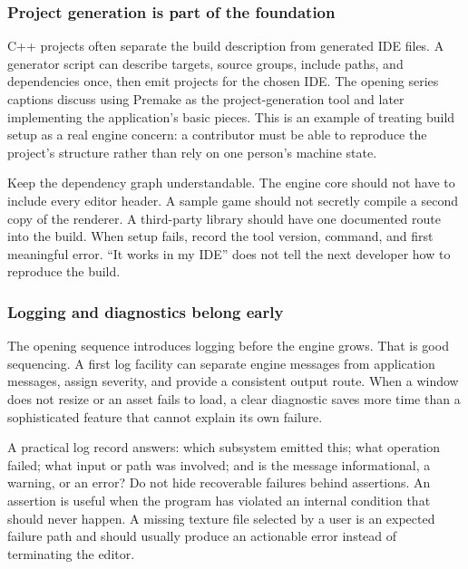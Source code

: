 \subsubsection{Project generation is part of the foundation}\label{05-engine-i-ch013-project-generation-is-part-of-the-foundation}

\hypertarget{05-engine-i-ch013-project-generation-is-part-of-the-foundation}{}

C++ projects often separate the build description from generated IDE files. A generator script can describe targets, source groups, include paths, and dependencies once, then emit projects for the chosen IDE. The opening series captions discuss using Premake as the project-generation tool and later implementing the application's basic pieces. This is an example of treating build setup as a real engine concern: a contributor must be able to reproduce the project's structure rather than rely on one person's machine state.

Keep the dependency graph understandable. The engine core should not have to include every editor header. A sample game should not secretly compile a second copy of the renderer. A third-party library should have one documented route into the build. When setup fails, record the tool version, command, and first meaningful error. ``It works in my IDE'' does not tell the next developer how to reproduce the build.

\subsubsection{Logging and diagnostics belong early}\label{05-engine-i-ch013-logging-and-diagnostics-belong-early}

\hypertarget{05-engine-i-ch013-logging-and-diagnostics-belong-early}{}

The opening sequence introduces logging before the engine grows. That is good sequencing. A first log facility can separate engine messages from application messages, assign severity, and provide a consistent output route. When a window does not resize or an asset fails to load, a clear diagnostic saves more time than a sophisticated feature that cannot explain its own failure.

A practical log record answers: which subsystem emitted this; what operation failed; what input or path was involved; and is the message informational, a warning, or an error? Do not hide recoverable failures behind assertions. An assertion is useful when the program has violated an internal condition that should never happen. A missing texture file selected by a user is an expected failure path and should usually produce an actionable error instead of terminating the editor.

